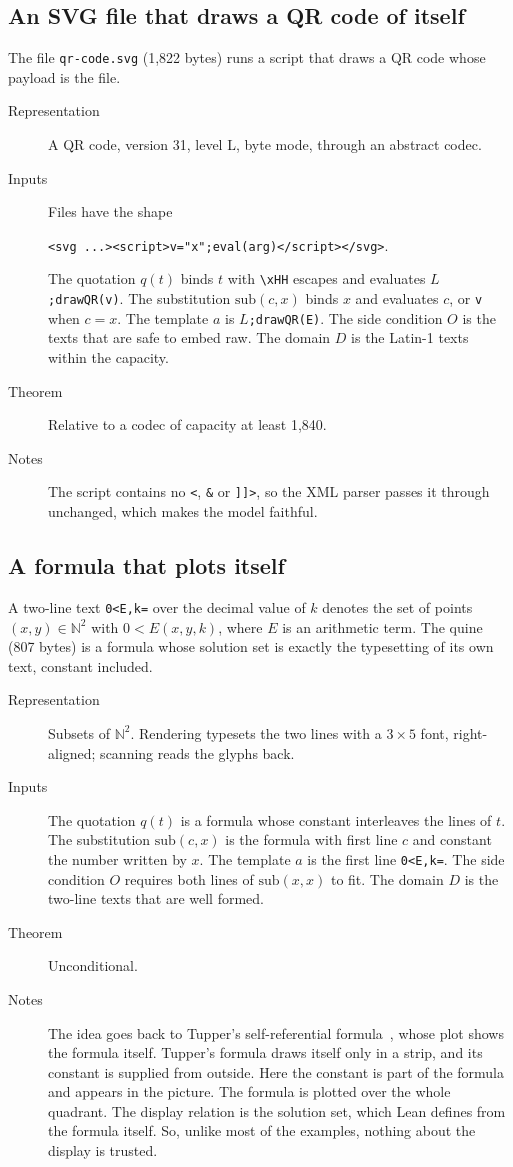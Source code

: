 \documentclass[11pt]{amsart}
\theoremstyle{definition}
\theoremstyle{remark}
\newcommand{\sub}{\mathrm{sub}}
\newcommand{\lean}[1]{\texttt{#1}}
\begin{document}
\subsection{An SVG file that draws a QR code of itself}
The file \lean{qr-code.svg} (1,822 bytes) runs a script that draws a QR code whose payload is the
file.
\begin{description}
\item[Representation] A QR code, version 31, level L, byte mode, through an abstract codec.
\item[Inputs] Files have the shape
\begin{center}
\verb|<svg ...><script>v="x";eval(arg)</script></svg>|.
\end{center}
The quotation $q(t)$ binds $t$ with \verb|\xHH| escapes and evaluates
$L$\verb|;drawQR(v)|. The substitution $\sub(c,x)$ binds $x$ and evaluates $c$, or \verb|v| when $c
= x$. The template $a$ is $L$\verb|;drawQR(E)|. The side condition $O$ is the texts that are safe
to embed raw. The domain $D$ is the Latin-1 texts within the capacity.
\item[Theorem] Relative to a codec of capacity at least 1,840.
\item[Notes] The script contains no \verb|<|, \verb|&| or \verb|]]>|, so the XML parser passes it
through unchanged, which makes the model faithful.
\end{description}

\subsection{A formula that plots itself}
A two-line text \verb|0<E,k=| over the decimal value of $k$ denotes the set of points $(x,y) \in
\mathbb{N}^2$ with $0 < E(x,y,k)$, where $E$ is an arithmetic term. The quine (807 bytes) is a
formula whose solution set is exactly the typesetting of its own text, constant included.
\begin{description}
\item[Representation] Subsets of $\mathbb{N}^2$. Rendering typesets the two lines with a $3 \times
5$ font, right-aligned; scanning reads the glyphs back.
\item[Inputs] The quotation $q(t)$ is a formula whose constant interleaves the lines of $t$. The
substitution $\sub(c,x)$ is the formula with first line $c$ and constant the number written by $x$.
The template $a$ is the first line \verb|0<E,k=|. The side condition $O$ requires both lines of
$\sub(x,x)$ to fit. The domain $D$ is the two-line texts that are
well formed.
\item[Theorem] Unconditional.
\item[Notes] The idea goes back to Tupper's self-referential formula~\cite{Tupper}, whose plot
shows the formula itself. Tupper's formula draws itself only in a strip, and its constant is
supplied from outside. Here the constant is part of the formula and appears in the picture. The
formula is plotted over the whole quadrant. The display relation is the
solution set, which Lean defines from the formula itself. So, unlike most of the examples, nothing
about the display is trusted.
\end{description}
\end{document}
